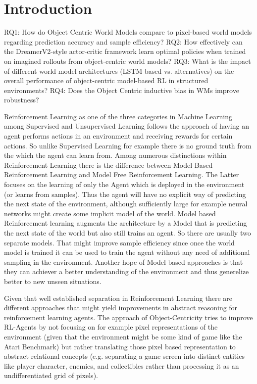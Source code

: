 \documentclass[
	english,
	ruledheaders=section,
	class=report,
	thesis={type=master},
	accentcolor=9c,
	custommargins=true,
	marginpar=false,
	parskip=half-,
	fontsize=11pt,
]{tudapub}
\begin{document}
\chapter{Introduction}	
\label{chap:introduction}
RQ1: How do Object Centric World Models compare to pixel-based world models regarding prediction accuracy and sample efficiency?
RQ2: How effectively can the DreamerV2-style actor-critic framework learn optimal policies when trained on imagined rollouts from object-centric world models?
RQ3: What is the impact of different world model architectures (LSTM-based vs. alternatives) on the overall performance of object-centric model-based RL in structured environments?
RQ4: Does the Object Centric inductive bias in WMs improve robustness?

Reinforcement Learning as one of the three categories in Machine Learning among Supervised and Unsupervised Learning follows the approach of having an agent performs actions in an environment and receiving rewards
for certain actions. So unlike Supervised Learning for example there is no ground truth from the which the agent can learn from. Among numerous distinctions within Reinforcement Learning there is the difference 
between Model Based Reinforcement Learning and Model Free Reinforcement Learning. The Latter focuses on the learning of only the Agent which is deployed in the environment (or learns from samples). Thus the agent
will have no explicit way of predicting the next state of the environment, although sufficiently large for example neural networks might create some implicit model of the world. Model based Reinforcement learning 
augments the architecture by a Model that is predicting the next state of the world but also still trains an agent. So there are usually two separate models. That might improve sample efficiency since once the world model
is trained it can be used to train the agent without any need of additional sampling in the environment. Another hope of Model based approaches is that they can achiever a better understanding of the environment and thus
generelize better to new unseen situations.

Given that well established separation in Reinforcement Learning there are different approaches that might yield improvements in abstract reasoning for reinforcement learning agents. The approach of Object-Centricity tries to
improve RL-Agents by not focusing on for example pixel representations of the environment (given that the environment might be some kind of game like the Atari Benchmark) but rather translating those pixel based representation
to abstract relational concepts (e.g. separating a game screen into distinct entities like player character, enemies, and collectibles rather than processing it as an undifferentiated grid of pixels).
\end{document}
